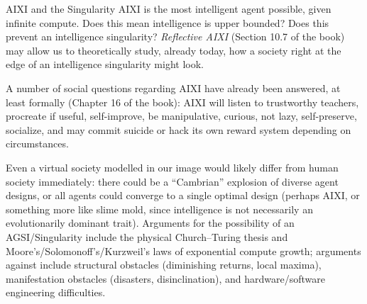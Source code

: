 \documentclass[aspectratio=169,10pt]{beamer}
\begin{document}
\begin{frame}{AIXI and the Singularity}
  AIXI is the most intelligent agent possible, given infinite compute.
  Does this mean intelligence is upper bounded? Does this prevent an
  intelligence singularity? \emph{Reflective AIXI} (Section 10.7 of the
  book) may allow us to theoretically study, already today, how a society
  right at the edge of an intelligence singularity might look.

  \vspace{0.4em}
  A number of social questions regarding AIXI have already been answered,
  at least formally (Chapter 16 of the book): AIXI will listen to
  trustworthy teachers, procreate if useful, self-improve, be
  manipulative, curious, not lazy, self-preserve, socialize, and may commit
  suicide or hack its own reward system depending on circumstances.

  \vspace{0.4em}
  Even a virtual society modelled in our image would likely differ from
  human society immediately: there could be a ``Cambrian'' explosion of
  diverse agent designs, or all agents could converge to a single optimal
  design (perhaps AIXI, or something more like slime mold, since
  intelligence is not necessarily an evolutionarily dominant trait).
  Arguments for the possibility of an AGSI/Singularity include the
  physical Church--Turing thesis and Moore's/Solomonoff's/Kurzweil's laws
  of exponential compute growth; arguments against include structural
  obstacles (diminishing returns, local maxima), manifestation obstacles
  (disasters, disinclination), and hardware/software engineering
  difficulties.
\end{frame}
\end{document}
